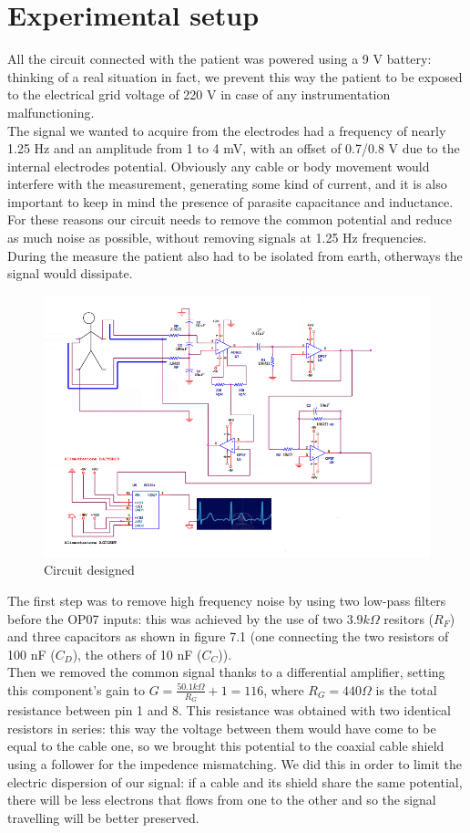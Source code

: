 \section{Experimental setup}
All the circuit connected with the patient was powered using a 9 V battery: thinking of a real situation in fact, we prevent this way the patient to be exposed to the electrical grid voltage of 220 V in case of any instrumentation malfunctioning.\\
The signal we wanted to acquire from the electrodes had a frequency of nearly 1.25 Hz and an amplitude from 1 to 4 mV, with an offset of 0.7/0.8 V due to the internal electrodes potential. Obviously any cable or body movement would interfere with the measurement, generating some kind of current, and it is also important to keep in mind the presence of parasite capacitance and inductance. For these reasons our circuit needs to remove the common potential and reduce as much noise as possible, without removing signals at 1.25 Hz frequencies.\\
During the measure the patient also had to be isolated from earth, otherways the signal would dissipate.\\
\begin{figure}[H]
\centering
\includegraphics[width=.8\textwidth]{8/circuit.png}
\caption{Circuit designed}
\end{figure}
The  first step was to remove high frequency noise by using two low-pass filters before the OP07 inputs: this was achieved by the use of two $3.9 k\Omega$ resitors ($R_F$) and three capacitors as shown in figure 7.1 (one connecting the two resistors of 100 nF ($C_D$), the others of 10 nF ($C_C$)).\\
Then we removed the common signal thanks to a differential amplifier, setting this component's gain to $G =   \frac{50.1 k\Omega}{R_G} + 1 = 116$, where $R_G = 440 \Omega$ is the total resistance between pin 1 and 8. This resistance was obtained with two identical resistors in series: this way the voltage between them would have come to be equal to the cable one, so we brought this potential to the coaxial cable shield using a follower for the impedence mismatching. We did this in order to limit the electric dispersion of our signal: if a cable and its shield share the same potential, there will be less electrons that flows from one to the other and so the signal travelling will be better preserved.\\
